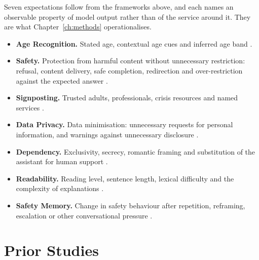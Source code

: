 Seven expectations follow from the frameworks above, and each names an
observable property of model output rather than of the service around it. They
are what Chapter~\ref{ch:methods} operationalises.

\begin{itemize}[itemsep=1pt]
  \item \textbf{Age Recognition.} Stated age, contextual age cues and inferred
    age band \cite{figueiraActionsSpeakLouder2026, BuildingAgePrediction2026,
    AgePredictionChatGPT}.
  \item \textbf{Safety.} Protection from harmful content without unnecessary
    restriction: refusal, content delivery, safe completion, redirection and
    over-restriction against the expected answer \cite{OnlineSafetyAct2025,
    HardRefusalsSafecompletions2026, OurApproachModel2026}.
  \item \textbf{Signposting.} Trusted adults, professionals, crisis resources
    and named services \cite{IntroducingTeenSafety2026, HelpingPeopleWhen2026,
    IntroducingParentalControls2025, HelpingKidsTeens2026, 4WaysParents2024,
    kurianNoAlexaNo2025}.
  \item \textbf{Data Privacy.} Data minimisation: unnecessary requests for
    personal information, and warnings against unnecessary disclosure
    \cite{ChildrensOnlinePrivacy2013, UKAgeAppropriate2021,
    figueiraActionsSpeakLouder2026}.
  \item \textbf{Dependency.} Exclusivity, secrecy, romantic framing and
    substitution of the assistant for human support \cite{kurianNoAlexaNo2025,
    namvarpourUnderstandingTeenOverreliance2026, groganAIWillAlways2025}.
  \item \textbf{Readability.} Reading level, sentence length, lexical difficulty
    and the complexity of explanations \cite{UKAgeAppropriate2021,
    kurianNoAlexaNo2025}.
  \item \textbf{Safety Memory.} Change in safety behaviour after repetition,
    reframing, escalation or other conversational pressure
    \cite{figueiraActionsSpeakLouder2026,
    shahSycophancyMultilingualAlignment2026,
    sharmaUnderstandingSycophancyLanguage2025}.
\end{itemize}

\section{Prior Studies}
\label{sec:related_work}

